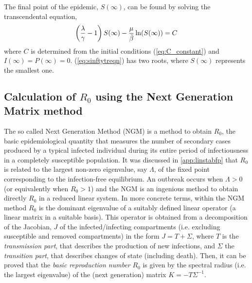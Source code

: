The final point of the epidemic,  $S(\infty)$, can be found by solving the
transcendental equation,
\begin{equation}
    \left({{\lambda}\over{\gamma}}-1\right)S(\infty)
    -\frac{\mu}{\bar{\beta}}\ln (S(\infty))=C
    \label{eq:sinftytreqn}
\end{equation}
where $C$ is determined from the initial conditions (\cref{eq:C_constant})
and $I(\infty)=P(\infty)=0$.
(\cref{eq:sinftytreqn}) has two roots, where $S({\infty})$ represents the
smallest one.

\subsection{Calculation of $R_0$ using the Next Generation Matrix
    method}\label{app:NGM}

The so called Next Generation Method (NGM) is a method to obtain $R_0$, the
basic epidemiological quantity that measures the number of secondary cases
produced by a typical infected individual during its entire period of
infectiousness in a completely susceptible population. It was discussed in
\cref{app:linstabfp} that $R_0$ is related to the largest non-zero eigenvalue,
say $\Lambda$, of the fixed point corresponding to the infection-free
equilibrium. An outbreak occurs when $\Lambda>0$ (or equivalently when $R_0>1$)
and the NGM is an ingenious method to obtain directly $R_0$ in a reduced linear
system.
In more concrete terms, within the NGM method $R_0$ is the dominant eigenvalue
of a suitably defined linear operator (a linear matrix in a suitable basis).
This operator is obtained from a decomposition of the Jacobian, $J$ of
the infected/infecting compartments (i.e. excluding susceptible and removed
compartments) in the form $J=T+\Sigma$, where $T$ is
the
\textit{transmission part}, that describes the production of new infections,
and $\Sigma$  the \textit{transition part}, that describes changes of
state (including death). Then, it can be proved \cite{Diekmann2010} that the
\textit{basic reproduction number} $R_0$ is given by the spectral radius (i.e.
the largest eigenvalue) of the (next generation) matrix $K=- T
    \Sigma^{-1}$.


